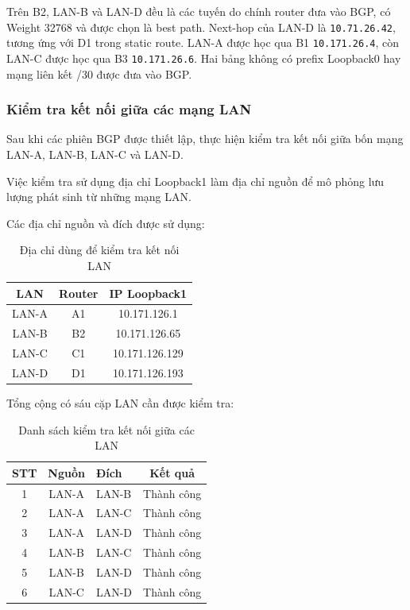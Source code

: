 Trên B2, LAN-B và LAN-D đều là các tuyến
do chính router đưa vào BGP, có Weight 32768
và được chọn là best path.
Next-hop của LAN-D là \texttt{10.71.26.42},
tương ứng với D1 trong static route.
LAN-A được học qua B1 \texttt{10.171.26.4},
còn LAN-C được học qua B3 \texttt{10.171.26.6}.
Hai bảng không có prefix Loopback0
hay mạng liên kết /30 được đưa vào BGP.



\subsubsection{Kiểm tra kết nối giữa các mạng LAN}

Sau khi các phiên BGP được thiết lập,
thực hiện kiểm tra kết nối giữa
bốn mạng LAN-A, LAN-B, LAN-C và LAN-D.

Việc kiểm tra sử dụng địa chỉ
Loopback1 làm địa chỉ nguồn
để mô phỏng lưu lượng phát sinh
từ những mạng LAN.

Các địa chỉ nguồn và đích
được sử dụng:

\begin{table}[H]
\centering
\caption{Địa chỉ dùng để kiểm tra kết nối LAN}
\label{tab:partD-lan-address}
\small
\begin{tabular}{ccc}
\toprule
\textbf{LAN} &
\textbf{Router} &
\textbf{IP Loopback1} \\
\midrule
LAN-A & A1 & 10.171.126.1 \\
LAN-B & B2 & 10.171.126.65 \\
LAN-C & C1 & 10.171.126.129 \\
LAN-D & D1 & 10.171.126.193 \\
\bottomrule
\end{tabular}
\end{table}

Tổng cộng có sáu cặp LAN
cần được kiểm tra:

\begin{table}[H]
\centering
\caption{Danh sách kiểm tra kết nối giữa các LAN}
\label{tab:partD-lan-ping}
\small
\begin{tabularx}{\textwidth}{c c X c}
\toprule
\textbf{STT} &
\textbf{Nguồn} &
\textbf{Đích} &
\textbf{Kết quả} \\
\midrule
1 & LAN-A & LAN-B & Thành công \\
2 & LAN-A & LAN-C & Thành công \\
3 & LAN-A & LAN-D & Thành công \\
4 & LAN-B & LAN-C & Thành công \\
5 & LAN-B & LAN-D & Thành công \\
6 & LAN-C & LAN-D & Thành công \\
\bottomrule
\end{tabularx}
\end{table}

